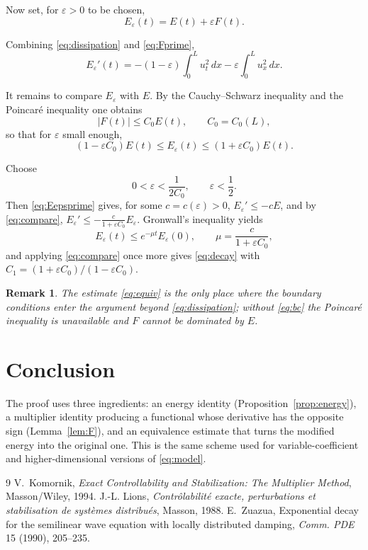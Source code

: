 \documentclass[11pt]{article}
\newtheorem{remark}{Remark}
\theoremstyle{definition}
\begin{document}
Now set, for $\varepsilon>0$ to be chosen,
\begin{equation}
E_{\varepsilon}(t)=E(t)+\varepsilon F(t).
\label{eq:Eeps}
\end{equation}

Combining \eqref{eq:dissipation} and \eqref{eq:Fprime},
\begin{equation}
E_{\varepsilon}'(t)=-(1-\varepsilon)\int_{0}^{L}u_{t}^{2}\,dx-\varepsilon\int_{0}^{L}u_{x}^{2}\,dx .
\label{eq:Eepsprime}
\end{equation}

It remains to compare $E_{\varepsilon}$ with $E$. By the Cauchy--Schwarz inequality and
the Poincaré inequality one obtains
\begin{equation}
|F(t)|\le C_{0}E(t),\qquad C_{0}=C_{0}(L),
\label{eq:equiv}
\end{equation}
so that for $\varepsilon$ small enough,
\begin{equation}
(1-\varepsilon C_{0})E(t)\le E_{\varepsilon}(t)\le(1+\varepsilon C_{0})E(t).
\label{eq:compare}
\end{equation}

Choose
\begin{equation}
0<\varepsilon<\frac{1}{2C_{0}},\qquad \varepsilon<\frac12 .
\label{eq:eps}
\end{equation}
Then \eqref{eq:Eepsprime} gives, for some $c=c(\varepsilon)>0$,
$E_{\varepsilon}'\le-cE$, and by \eqref{eq:compare},
$E_{\varepsilon}'\le-\frac{c}{1+\varepsilon C_{0}}E_{\varepsilon}$.
Gronwall's inequality yields
\[
E_{\varepsilon}(t)\le e^{-\mu t}E_{\varepsilon}(0),\qquad
\mu=\frac{c}{1+\varepsilon C_{0}},
\]
and applying \eqref{eq:compare} once more gives \eqref{eq:decay} with
$C_{1}=(1+\varepsilon C_{0})/(1-\varepsilon C_{0})$.

\begin{remark}
The estimate \eqref{eq:equiv} is the only place where the boundary conditions enter the
argument beyond \eqref{eq:dissipation}; without \eqref{eq:bc} the Poincaré inequality is
unavailable and $F$ cannot be dominated by $E$.
\end{remark}

\section{Conclusion}

The proof uses three ingredients: an energy identity
(Proposition~\ref{prop:energy}), a multiplier identity producing a functional whose
derivative has the opposite sign (Lemma~\ref{lem:F}), and an equivalence estimate that
turns the modified energy into the original one. This is the same scheme used for
variable-coefficient and higher-dimensional versions of \eqref{eq:model}.

\begin{thebibliography}{9}
 V.~Komornik, \emph{Exact Controllability and Stabilization: The
Multiplier Method}, Masson/Wiley, 1994.
 J.-L. Lions, \emph{Contrôlabilité exacte, perturbations et stabilisation
de systèmes distribués}, Masson, 1988.
 E.~Zuazua, Exponential decay for the semilinear wave equation with
locally distributed damping, \emph{Comm. PDE} 15 (1990), 205--235.
\end{thebibliography}
\end{document}
